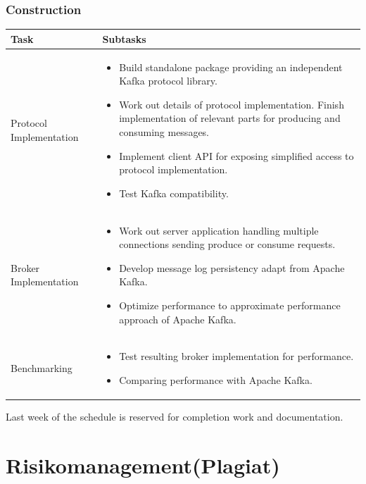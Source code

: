 \subsubsection{Construction}
\begin{tabular}[H]{|p{6cm}|p{10cm}|}\hline
   \textbf{Task} & \textbf{Subtasks} \\ \hline
    Protocol Implementation &
        \begin{itemize}
            \item Build standalone package providing an independent Kafka
                protocol library.
            \item Work out details of protocol implementation. Finish
                implementation of relevant parts for producing and consuming
                messages. 
            \item Implement client API for exposing simplified access to protocol
                implementation.
            \item Test Kafka compatibility.
        \end{itemize} \\ \hline
    Broker Implementation &
        \begin{itemize}
            \item Work out server application handling multiple connections
            sending produce or consume requests.
            \item Develop message log persistency adapt from Apache Kafka. 
            \item Optimize performance to approximate performance approach of
            Apache Kafka. 
        \end{itemize} \\ \hline
    Benchmarking &
        \begin{itemize}
            \item Test resulting broker implementation for performance.
            \item Comparing performance with Apache Kafka.
        \end{itemize} \\ \hline
\end{tabular}

Last week of the schedule is reserved for completion work and documentation. 



\newpage
\section{Risikomanagement(Plagiat)}

